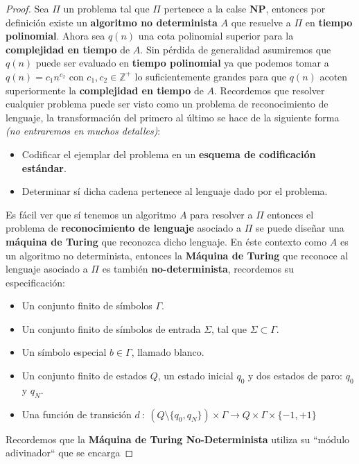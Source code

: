 \documentclass{article}
\begin{document}
\begin{proof}
    Sea \(\Pi\) un problema tal que \(\Pi\) pertenece a la calse \(\mathbf{NP}\), entonces por definición existe un \textbf{algoritmo no determinista} \(A\)
    que resuelve a \(\Pi\) en \textbf{tiempo polinomial}. Ahora sea \(q(n)\) una cota polinomial superior para la \textbf{complejidad en tiempo} de \(A\).
    Sin pérdida de generalidad asumiremos que \(q(n)\) puede ser evaluado en \textbf{tiempo polinomial} ya que podemos tomar a \(q(n) = c_{1}n^{c_{2}}\) con 
    \(c_{1}, c_{2} \in \mathbb{Z}^{+}\) lo suficientemente grandes para que \(q(n)\) acoten superiormente la \textbf{complejidad en tiempo} de \(A\).
    Recordemos que resolver cualquier problema puede ser visto como un problema de reconocimiento de lenguaje, la transformación del primero al último 
    se hace de la siguiente forma \textit{(no entraremos en muchos detalles)}:
    \begin{itemize}
        \item Codificar el ejemplar del problema en un \textbf{esquema de codificación estándar}.
        \item Determinar sí dicha cadena pertenece al lenguaje dado por el problema.
    \end{itemize}
    Es fácil ver que sí tenemos un algoritmo \(A\) para resolver a \(\Pi\) entonces el problema de \textbf{reconocimiento de lenguaje} asociado 
    a \(\Pi\) se puede diseñar una \textbf{máquina de Turing} que reconozca dicho lenguaje. En éste contexto como \(A\) es un algoritmo no determinista, 
    entonces la \textbf{Máquina de Turing} que reconoce al lenguaje asociado a \(\Pi\) es también \textbf{no-determinista}, recordemos su especificación:
    \begin{itemize}
        \item Un conjunto finito de símbolos \(\varGamma\).
        \item Un conjunto finito de símbolos de entrada \(\Sigma\), tal que \(\Sigma \subset \varGamma\).
        \item Un símbolo especial \(b \in \varGamma\), llamado blanco.
        \item Un conjunto finito de estados \(Q\), un estado inicial \(q_{0}\) y dos estados de paro: \(q_{0}\) y \(q_{N}\).
        \item Una función de transición \(d \ : \ \left(Q \setminus \{q_{0}, q_{N}\} \right) \times \varGamma \longrightarrow Q \times \varGamma \times \{-1, +1\}\)
    \end{itemize}
    Recordemos que la \textbf{Máquina de Turing No-Determinista} utiliza su ``módulo adivinador`` que se encarga 

\end{proof}
\end{document}
